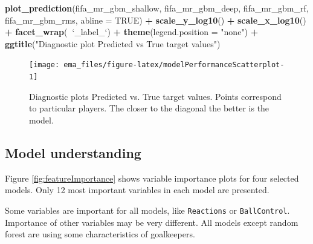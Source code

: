 \documentclass[12pt,]{krantz}
\newenvironment{Shaded}{\begin{snugshade}}{\end{snugshade}}
\newcommand{\DataTypeTok}[1]{\textcolor[rgb]{0.13,0.29,0.53}{#1}}
\newcommand{\KeywordTok}[1]{\textcolor[rgb]{0.13,0.29,0.53}{\textbf{#1}}}
\newcommand{\NormalTok}[1]{#1}
\newcommand{\OperatorTok}[1]{\textcolor[rgb]{0.81,0.36,0.00}{\textbf{#1}}}
\newcommand{\OtherTok}[1]{\textcolor[rgb]{0.56,0.35,0.01}{#1}}
\newcommand{\StringTok}[1]{\textcolor[rgb]{0.31,0.60,0.02}{#1}}
\begin{document}
\begin{Shaded}
\begin{Highlighting}[]
\KeywordTok{plot_prediction}\NormalTok{(fifa_mr_gbm_shallow, fifa_mr_gbm_deep, }
\NormalTok{                fifa_mr_gbm_rf, fifa_mr_gbm_rms, }\DataTypeTok{abline =} \OtherTok{TRUE}\NormalTok{) }\OperatorTok{+}
\StringTok{  }\KeywordTok{scale_y_log10}\NormalTok{() }\OperatorTok{+}\StringTok{  }\KeywordTok{scale_x_log10}\NormalTok{() }\OperatorTok{+}
\StringTok{  }\KeywordTok{facet_wrap}\NormalTok{(}\OperatorTok{~}\StringTok{`}\DataTypeTok{_label_}\StringTok{`}\NormalTok{) }\OperatorTok{+}\StringTok{ }\KeywordTok{theme}\NormalTok{(}\DataTypeTok{legend.position =} \StringTok{"none"}\NormalTok{) }\OperatorTok{+}
\StringTok{  }\KeywordTok{ggtitle}\NormalTok{(}\StringTok{"Diagnostic plot Predicted vs True target values"}\NormalTok{)}
\end{Highlighting}
\end{Shaded}

\begin{figure}

{\centering \texttt{[image: ema\_files/figure-latex/modelPerformanceScatterplot-1]} 

}

\caption{Diagnostic plots Predicted vs. True target values. Points correspond to particular players. The closer to the diagonal the better is the model.}\label{fig:modelPerformanceScatterplot}
\end{figure}

\hypertarget{model-understanding-1}{%
\subsection{Model understanding}\label{model-understanding-1}}

Figure \ref{fig:featureImportance} shows variable importance plots for four selected models. Only 12 most important variables in each model are presented.

Some variables are important for all models, like \texttt{Reactions} or \texttt{BallControl}. Importance of other variables may be very different. All models except random forest are using some characteristics of goalkeepers.
\end{document}

